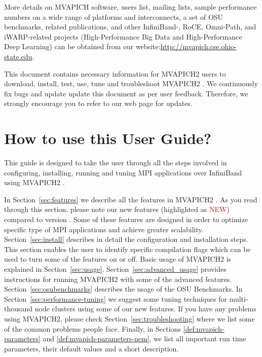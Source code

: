 More details on MVAPICH software, users list, mailing lists, sample performance
numbers on a wide range of platforms and interconnects, a set of OSU benchmarks,
related publications, and other InfiniBand-, RoCE, Omni-Path, and iWARP-related projects (High-Performance Big Data and High-Performance Deep Learning)
can be obtained from our
website:\href{http://mvapich.cse.ohio-state.edu}{http://mvapich.cse.ohio-state.edu}.


This document contains necessary information for MVAPICH2 users to download,
install, test, use, tune and troubleshoot MVAPICH2 \mvapichversion.  We
continuously fix bugs and update update this document as per user feedback.
Therefore, we strongly encourage you to refer to our web page for updates.



\section{How to use this User Guide?}

This guide is designed to take the user through all the steps involved in
configuring, installing, running and tuning MPI applications over InfiniBand
using MVAPICH2 \mvapichversion.

In Section~\ref{sec:features} we describe all the features in MVAPICH2
\mvapichversion. As you read through this section, please note our new features
(highlighted as \textcolor{red}{NEW}) compared to version \mvapicholdversion.
Some of these features are designed in order to optimize specific type of MPI
applications and achieve greater scalability.  Section~\ref{sec:install}
describes in detail the configuration and installation steps.  This section
enables the user to identify specific compilation flags which can be used to
turn some of the features on or off.  Basic usage of MVAPICH2 is explained in
Section~\ref{sec:usage}. Section~\ref{sec:advanced_usage} provides instructions
for running MVAPICH2 with some of the advanced features.
Section~\ref{sec:osubenchmarks} describes the usage of the OSU Benchmarks.
In Section~\ref{sec:performance-tuning} we suggest some tuning techniques
for multi-thousand node clusters using some of our new features.  If you
have any problems using MVAPICH2, please check
Section~\ref{sec:troubleshooting} where we list some of the common
problems people face.  Finally, in Sections \ref{def:mvapich-parameters}
and \ref{def:mvapich-parameters-nem}, we list all important run time
parameters, their default values and a short description.



